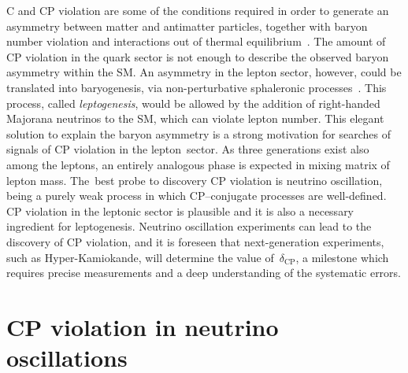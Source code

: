 C and CP violation are some of the conditions required in order to generate %
an asymmetry between matter and antimatter particles, together with %
baryon number violation and interactions out of thermal equilibrium~\cite{Sakharov:1967dj}.
The amount of CP violation in the quark sector is not enough %
to describe the observed baryon asymmetry within the SM.
An asymmetry in the lepton sector, however, could be translated into baryogenesis, %
via non-perturbative sphaleronic processes~\cite{Fukugita:1986hr}.
This process, called \emph{leptogenesis}, would be allowed by the addition of %
right-handed Majorana neutrinos to the SM, which can violate lepton number.
This elegant solution to explain the baryon asymmetry is a strong motivation %
for searches of signals of CP violation in the lepton~sector.
As three generations exist also among the leptons, %
an entirely analogous phase is expected in mixing matrix of lepton mass.
The~best probe to discovery CP violation is neutrino oscillation, being a purely weak process in which %
CP--conjugate processes are well-defined.
CP violation in the leptonic sector is plausible and it is also a necessary ingredient for leptogenesis.
Neutrino oscillation experiments can lead to the discovery of CP violation, and it is %
foreseen that next-generation experiments, such as Hyper-Kamiokande, will determine the value of~$\delta_\text{CP}$, %
a milestone which requires precise measurements and a deep understanding of the systematic errors.


\section{CP violation in neutrino oscillations}
\label{sec:cp_oscillation}

